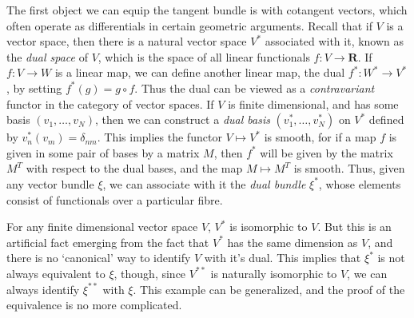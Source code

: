The first object we can equip the tangent bundle is with cotangent vectors, which often operate as differentials in certain geometric arguments. Recall that if $V$ is a vector space, then there is a natural vector space $V^*$ associated with it, known as the {\it dual space} of $V$, which is the space of all linear functionals $f: V \to \mathbf{R}$. If $f: V \to W$ is a linear map, we can define another linear map, the dual $f^*: W^* \to V^*$, by setting $f^*(g) = g \circ f$. Thus the dual can be viewed as a {\it contravariant} functor in the category of vector spaces. If $V$ is finite dimensional, and has some basis $(v_1, \dots, v_N)$, then we can construct a {\it dual basis} $(v_1^*, \dots, v_N^*)$ on $V^*$ defined by $v_n^*(v_m) = \delta_{nm}$. This implies the functor $V \mapsto V^*$ is smooth, for if a map $f$ is given in some pair of bases by a matrix $M$, then $f^*$ will be given by the matrix $M^T$ with respect to the dual bases, and the map $M \mapsto M^T$ is smooth. Thus, given any vector bundle $\xi$, we can associate with it the {\it dual bundle} $\xi^*$, whose elements consist of functionals over a particular fibre.

For any finite dimensional vector space $V$, $V^*$ is isomorphic to $V$. But this is an artificial fact emerging from the fact that $V^*$ has the same dimension as $V$, and there is no `canonical' way to identify $V$ with it's dual. This implies that $\xi^*$ is not always equivalent to $\xi$, though, since $V^{**}$ is naturally isomorphic to $V$, we can always identify $\xi^{**}$ with $\xi$. This example can be generalized, and the proof of the equivalence is no more complicated.

